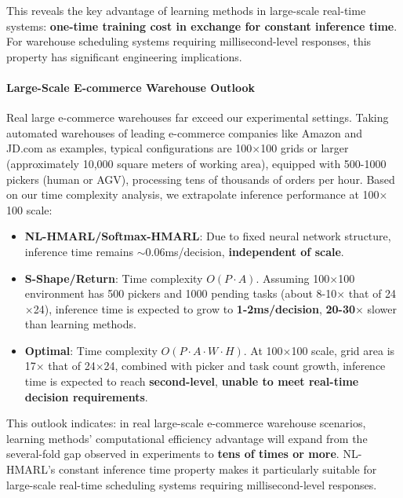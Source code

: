 \documentclass[12pt,a4paper]{article}
\begin{document}
This reveals the key advantage of learning methods in large-scale real-time systems: \textbf{one-time training cost in exchange for constant inference time}. For warehouse scheduling systems requiring millisecond-level responses, this property has significant engineering implications.

\paragraph{Large-Scale E-commerce Warehouse Outlook}

Real large e-commerce warehouses far exceed our experimental settings. Taking automated warehouses of leading e-commerce companies like Amazon and JD.com as examples, typical configurations are 100$\times$100 grids or larger (approximately 10,000 square meters of working area), equipped with 500-1000 pickers (human or AGV), processing tens of thousands of orders per hour. Based on our time complexity analysis, we extrapolate inference performance at 100$\times$100 scale:

\begin{itemize}
\item \textbf{NL-HMARL/Softmax-HMARL}: Due to fixed neural network structure, inference time remains $\sim$0.06ms/decision, \textbf{independent of scale}.

\item \textbf{S-Shape/Return}: Time complexity $O(P \cdot A)$. Assuming 100$\times$100 environment has 500 pickers and 1000 pending tasks (about 8-10$\times$ that of 24$\times$24), inference time is expected to grow to \textbf{1-2ms/decision}, \textbf{20-30$\times$} slower than learning methods.

\item \textbf{Optimal}: Time complexity $O(P \cdot A \cdot W \cdot H)$. At 100$\times$100 scale, grid area is 17$\times$ that of 24$\times$24, combined with picker and task count growth, inference time is expected to reach \textbf{second-level}, \textbf{unable to meet real-time decision requirements}.
\end{itemize}

This outlook indicates: in real large-scale e-commerce warehouse scenarios, learning methods' computational efficiency advantage will expand from the several-fold gap observed in experiments to \textbf{tens of times or more}. NL-HMARL's constant inference time property makes it particularly suitable for large-scale real-time scheduling systems requiring millisecond-level responses.
\end{document}
